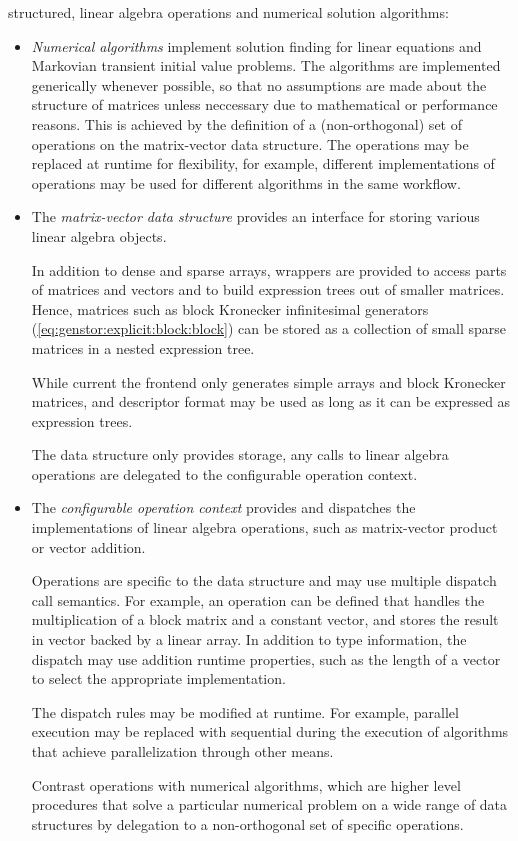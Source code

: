 structured, linear algebra operations and numerical solution
algorithms:
\begin{itemize}
\item \emph{Numerical algorithms} implement solution finding for linear
  equations and Markovian transient initial value problems. The
  algorithms are implemented generically whenever possible, so that no
  assumptions are made about the structure of matrices unless
  neccessary due to mathematical or performance reasons. This is
  achieved by the definition of a (non-orthogonal) set of operations
  on the matrix-vector data structure. The operations may be replaced
  at runtime for flexibility, for example, different implementations
  of operations may be used for different algorithms in the same
  workflow.

\item The \emph{matrix-vector data structure} provides an interface
  for storing various linear algebra objects.

  In addition to dense and sparse arrays, wrappers are provided to
  access parts of matrices and vectors and to build expression trees
  out of smaller matrices. Hence, matrices such as block Kronecker
  infinitesimal generators (\vref{eq:genstor:explicit:block:block})
  can be stored as a collection of small sparse matrices in a nested
  expression tree.

  While current the frontend only generates simple arrays and block
  Kronecker matrices, and descriptor format may be used as long as it
  can be expressed as expression trees.

  The data structure only provides storage, any calls to linear
  algebra operations are delegated to the configurable operation
  context.

\item The \emph{configurable operation context} provides and
  dispatches the implementations of linear algebra operations, such as
  matrix-vector product or vector addition.

  Operations are specific to the data structure and may use multiple
  dispatch call semantics. For example, an operation can be defined
  that handles the multiplication of a block matrix and a constant
  vector, and stores the result in vector backed by a linear
  array. In addition to type information, the dispatch may use
  addition runtime properties, such as the length of a vector to
  select the appropriate implementation.

  The dispatch rules may be modified at runtime. For example, parallel
  execution may be replaced with sequential during the execution of
  algorithms that achieve parallelization through other means.

  Contrast operations with numerical algorithms, which are higher level
  procedures that solve a particular numerical problem on a wide range
  of data structures by delegation to a non-orthogonal set of specific
  operations.
\end{itemize}

